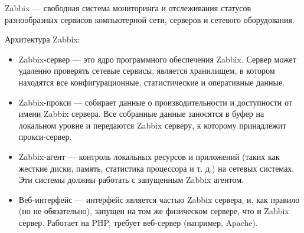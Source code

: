 
Zabbix ---  свободная система мониторинга и отслеживания статусов разнообразных сервисов компьютерной сети, серверов и сетевого оборудования. 

Архитектура Zabbix:
\begin{itemize}
\item Zabbix-сервер — это ядро программного обеспечения Zabbix. Сервер может удаленно проверять сетевые сервисы, является хранилищем, в котором находятся все конфигурационные, статистические и оперативные данные.
\item Zabbix-прокси — собирает данные о производительности и доступности от имени Zabbix сервера. Все собранные данные заносятся в буфер на локальном уровне и передаются Zabbix серверу, к которому принадлежит прокси-сервер.
\item Zabbix-агент — контроль локальных ресурсов и приложений (таких как жесткие диски, память, статистика процессора и т. д.) на сетевых системах. Эти системы должны работать с запущенным Zabbix агентом.
\item Веб-интерфейс — интерфейс является частью Zabbix сервера, и, как правило (но не обязательно), запущен на том же физическом сервере, что и Zabbix сервер. Работает на PHP, требует веб-сервер (например, Apache).
\end{itemize}